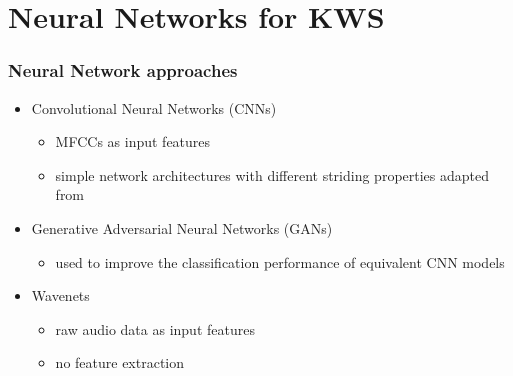 
\section{Neural Networks for KWS}

\begin{frame}
  \frametitle{Neural Network approaches}
  \begin{itemize}
    \item Convolutional Neural Networks (CNNs)
    \begin{itemize}
      \item MFCCs as input features
      \item simple network architectures with different striding properties adapted from \cite{Sainath2015KWS}
    \end{itemize}
    \item Generative Adversarial Neural Networks (GANs) \cite{Goodfellow2014GANs}
    \begin{itemize}
      \item used to improve the classification performance of equivalent CNN models
    \end{itemize}
    \item Wavenets \cite{Oord2016Wavenet}
    \begin{itemize}
      \item raw audio data as input features
      \item no feature extraction
    \end{itemize}
  \end{itemize}
\end{frame}

